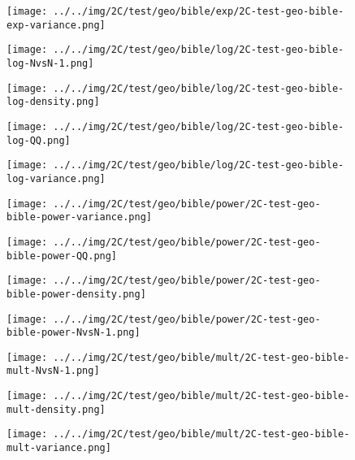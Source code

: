 \begin{figure}[H]
\centering	\texttt{[image: ../../img/2C/test/geo/bible/exp/2C-test-geo-bible-exp-variance.png]}
\end{figure}
\begin{figure}[H]
\centering	\texttt{[image: ../../img/2C/test/geo/bible/log/2C-test-geo-bible-log-NvsN-1.png]}
\end{figure}
\begin{figure}[H]
\centering	\texttt{[image: ../../img/2C/test/geo/bible/log/2C-test-geo-bible-log-density.png]}
\end{figure}
\begin{figure}[H]
\centering	\texttt{[image: ../../img/2C/test/geo/bible/log/2C-test-geo-bible-log-QQ.png]}
\end{figure}
\begin{figure}[H]
\centering	\texttt{[image: ../../img/2C/test/geo/bible/log/2C-test-geo-bible-log-variance.png]}
\end{figure}
\begin{figure}[H]
\centering	\texttt{[image: ../../img/2C/test/geo/bible/power/2C-test-geo-bible-power-variance.png]}
\end{figure}
\begin{figure}[H]
\centering	\texttt{[image: ../../img/2C/test/geo/bible/power/2C-test-geo-bible-power-QQ.png]}
\end{figure}
\begin{figure}[H]
\centering	\texttt{[image: ../../img/2C/test/geo/bible/power/2C-test-geo-bible-power-density.png]}
\end{figure}
\begin{figure}[H]
\centering	\texttt{[image: ../../img/2C/test/geo/bible/power/2C-test-geo-bible-power-NvsN-1.png]}
\end{figure}
\begin{figure}[H]
\centering	\texttt{[image: ../../img/2C/test/geo/bible/mult/2C-test-geo-bible-mult-NvsN-1.png]}
\end{figure}
\begin{figure}[H]
\centering	\texttt{[image: ../../img/2C/test/geo/bible/mult/2C-test-geo-bible-mult-density.png]}
\end{figure}
\begin{figure}[H]
\centering	\texttt{[image: ../../img/2C/test/geo/bible/mult/2C-test-geo-bible-mult-variance.png]}
\end{figure}

